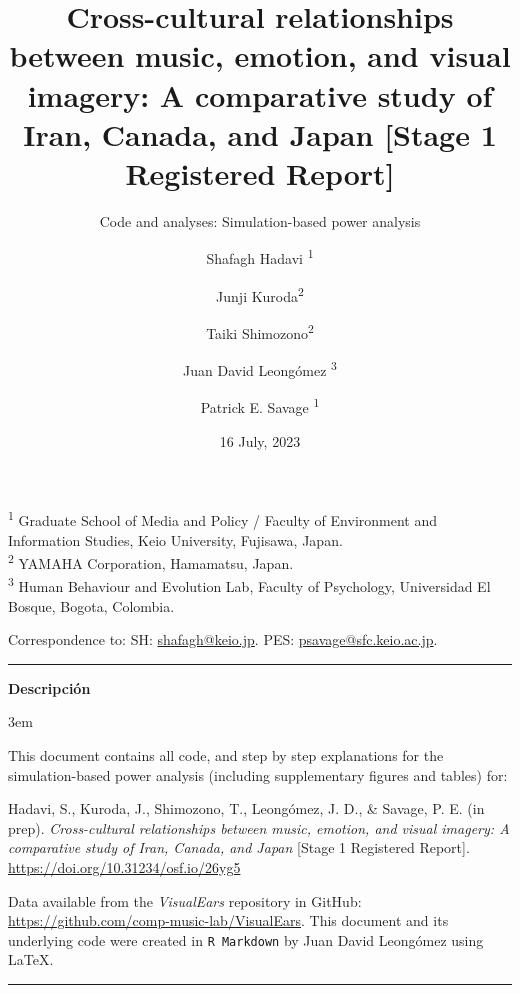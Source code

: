 \documentclass[
  bookmarksnumbered]{article}
\title{Cross-cultural relationships between music, emotion, and visual imagery: A comparative study of Iran, Canada, and Japan {[}Stage 1 Registered Report{]}}
\subtitle{Code and analyses: Simulation-based power analysis}
\author{Shafagh Hadavi \orcidlink{0009-0008-1184-7238}\textsuperscript{1} \and Junji Kuroda\textsuperscript{2} \and Taiki Shimozono\textsuperscript{2} \and Juan David Leongómez \orcidlink{0000-0002-0092-6298}\textsuperscript{3} \and Patrick E. Savage \orcidlink{0000-0001-6996-7496}\textsuperscript{1}}
\date{16 July, 2023}
\begin{document}
\maketitle

\textsuperscript{1} Graduate School of Media and Policy / Faculty of Environment and Information Studies, Keio University, Fujisawa, Japan.\\
\textsuperscript{2} YAMAHA Corporation, Hamamatsu, Japan.\\
\textsuperscript{3} Human Behaviour and Evolution Lab, Faculty of Psychology, Universidad El Bosque, Bogota, Colombia.

\begin{center}
Correspondence to:
SH: \href{mailto:shafagh@keio.jp}{shafagh@keio.jp}. 
PES: \href{mailto:psavage@sfc.keio.ac.jp}{psavage@sfc.keio.ac.jp}.

\begin{center}\rule{0.5\linewidth}{0.5pt}\end{center}

\textbf{Descripción}
\end{center}

\par
\begingroup
\leftskip3em
\rightskip\leftskip

This document contains all code, and step by step explanations for the simulation-based power analysis (including supplementary figures and tables) for:

\begin{hangparas}{.25in}{1}
Hadavi, S., Kuroda, J., Shimozono, T., Leongómez, J. D., \& Savage, P. E. (in prep). \textit{Cross-cultural relationships between music, emotion, and visual imagery: A comparative study of Iran, Canada, and Japan} [Stage 1 Registered Report]. \url{https://doi.org/10.31234/osf.io/26yg5}
\end{hangparas}

Data available from the \emph{VisualEars} repository in GitHub: \url{https://github.com/comp-music-lab/VisualEars}. This document and its underlying code were created in \texttt{R\ Markdown} by Juan David Leongómez using \LaTeX.

\begin{center}\rule{0.5\linewidth}{0.5pt}\end{center}

\par
\endgroup

{\hypersetup{hidelinks}
\setcounter{tocdepth}{6}
\tableofcontents
}
\opensupplement
\end{document}
